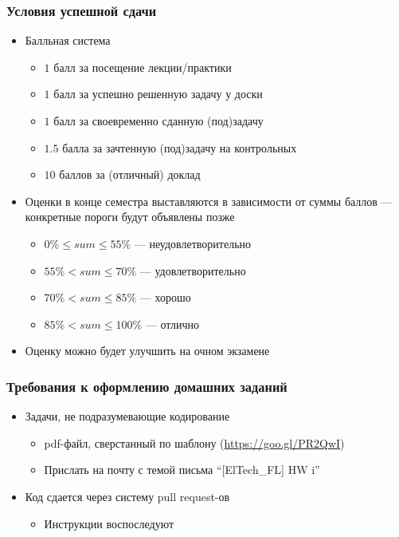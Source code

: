 \documentclass{beamer}
\begin{document}
\begin{frame}[fragile]
  \transwipe[direction=90]
  \frametitle{Условия успешной сдачи}
  \begin{itemize}
    \item Балльная система
    \begin{itemize}
      \item $1$ балл за посещение лекции/практики
      \item $1$ балл за успешно решенную задачу у доски 
      \item $1$ балл за своевременно сданную (под)задачу
      \item $1.5$ балла за зачтенную (под)задачу на контрольных
      \item $10$ баллов за (отличный) доклад
    \end{itemize}
    \item Оценки в конце семестра выставляются в зависимости от суммы баллов 
--- конкретные пороги будут объявлены позже
    \pause
    \begin{itemize}
      \item $0  \% \le sum \le 55 \%$ --- неудовлетворительно
      \item $55 \% < sum \le 70 \%$ --- удовлетворительно
      \item $70 \% < sum \le 85 \%$ --- хорошо
      \item $85 \% < sum \le 100 \%$ --- отлично
    \end{itemize}
  \end{itemize}
  \begin{itemize}
    \item Оценку можно будет улучшить на очном экзамене
  \end{itemize}
\end{frame}

\begin{frame}[fragile]
  \transwipe[direction=90]
  \frametitle{Требования к оформлению домашних заданий}
  \begin{itemize}
    \item Задачи, не подразумевающие кодирование
    \begin{itemize}
      \item pdf-файл, сверстанный по 
шаблону (\href{https://goo.gl/PR2QwI}{https://goo.gl/PR2QwI})
      \item Прислать на почту с темой письма ``[ElTech\_FL] HW i''
    \end{itemize}
    \item Код сдается через систему pull request-ов
    \begin{itemize}
      \item Инструкции воспоследуют
    \end{itemize}
  \end{itemize}
\end{frame}
\end{document}
